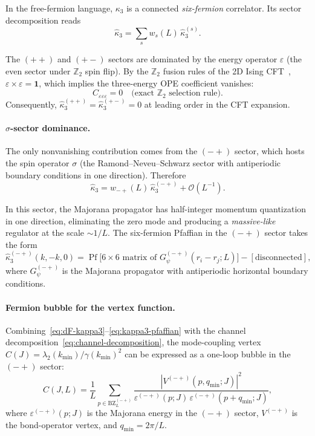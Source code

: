 \documentclass[11pt]{article}
\theoremstyle{definition}
\theoremstyle{remark}
\newcommand{\BZ}{\mathrm{BZ}}
\newcommand{\Pf}{\operatorname{Pf}}
\newcommand{\cO}{\mathcal{O}}
\newcommand{\Z}{\mathbb{Z}}
\begin{document}
In the free-fermion language, $\kappa_3$ is a connected \emph{six-fermion}
correlator. Its sector decomposition reads
\begin{equation}
  \hat{\kappa}_3 = \sum_{s} w_s(L)\,\hat{\kappa}_3^{(s)}.
  \label{eq:kappa3-sectors}
\end{equation}

The $(++)$ and $(+-)$ sectors are dominated by the energy operator
$\varepsilon$ (the even sector under $\Z_2$ spin flip). By the $\Z_2$
fusion rules of the 2D Ising CFT~\cite{McCoyWu1973},
$\varepsilon \times \varepsilon = \mathbf{1}$, which implies the
three-energy OPE coefficient vanishes:
\begin{equation}
  C_{\varepsilon\varepsilon\varepsilon} = 0
  \quad\text{(exact $\Z_2$ selection rule)}.
  \label{eq:ceee-zero}
\end{equation}
Consequently, $\hat{\kappa}_3^{(++)} = \hat{\kappa}_3^{(+-)} = 0$ at
leading order in the CFT expansion.

\paragraph{$\sigma$-sector dominance.}
The only nonvanishing contribution comes from the $(-+)$ sector, which
hosts the spin operator $\sigma$ (the Ramond--Neveu--Schwarz sector with
antiperiodic boundary conditions in one direction). Therefore
\begin{equation}
  \hat{\kappa}_3 = w_{-+}(L)\,\hat{\kappa}_3^{(-+)}
    + \cO(L^{-1}).
  \label{eq:kappa3-sigma}
\end{equation}

In this sector, the Majorana propagator has half-integer momentum
quantization in one direction, eliminating the zero mode and producing
a \emph{massive-like} regulator at the scale $\sim 1/L$.
The six-fermion Pfaffian in the $(-+)$ sector takes the form
\begin{equation}
  \hat{\kappa}_3^{(-+)}(k, -k, 0) = \Pf\bigl[6 \times 6\text{ matrix
    of } G_\psi^{(-+)}(r_i - r_j; L)\bigr]
    - [\text{disconnected}],
  \label{eq:kappa3-pfaffian}
\end{equation}
where $G_\psi^{(-+)}$ is the Majorana propagator with
antiperiodic horizontal boundary conditions.

\paragraph{Fermion bubble for the vertex function.}
Combining~\eqref{eq:dF-kappa3}--\eqref{eq:kappa3-pfaffian} with the
channel decomposition~\eqref{eq:channel-decomposition}, the
mode-coupling vertex $C(J) = \lambda_2(k_{\min})/\gamma(k_{\min})^2$
can be expressed as a one-loop bubble in the $(-+)$ sector:
\begin{equation}
  C(J, L) = \frac{1}{L}\sum_{p \in \BZ_L^{(-+)}}
    \frac{|V^{(-+)}(p, q_{\min}; J)|^2}
    {\varepsilon^{(-+)}(p; J)\,\varepsilon^{(-+)}(p + q_{\min}; J)},
  \label{eq:vertex-bubble}
\end{equation}
where $\varepsilon^{(-+)}(p; J)$ is the Majorana energy in the $(-+)$
sector, $V^{(-+)}$ is the bond-operator vertex, and
$q_{\min} = 2\pi/L$.
\end{document}
